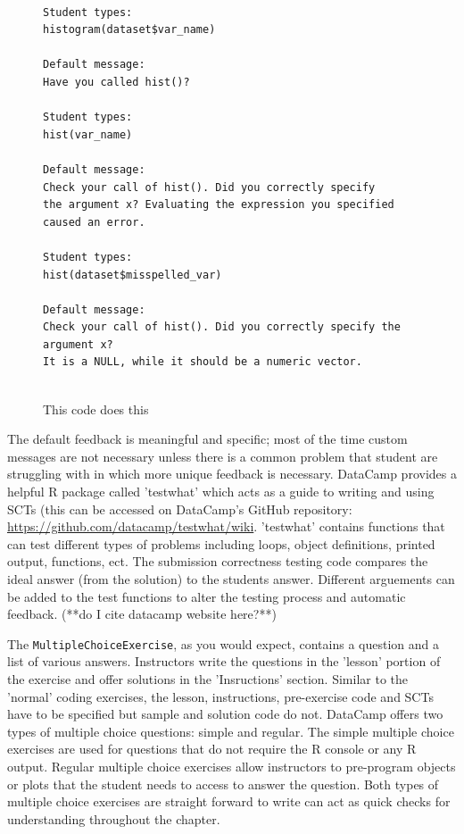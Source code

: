 \documentclass[12pt]{article}
\begin{document}
\begin{figure}
\caption{This code does this}
\begin{Verbatim}[frame=single]

Student types:
histogram(dataset$var_name)

Default message:
Have you called hist()?

Student types:
hist(var_name)

Default message:
Check your call of hist(). Did you correctly specify 
the argument x? Evaluating the expression you specified
caused an error.

Student types:
hist(dataset$misspelled_var)

Default message:
Check your call of hist(). Did you correctly specify the
argument x? 
It is a NULL, while it should be a numeric vector.


\end{Verbatim}
\label{fig:code1}
\end{figure}


















The default feedback is meaningful and specific; most of the time custom 
messages are not necessary unless there is a common problem that student are struggling with in which more unique feedback is necessary. 
DataCamp provides a helpful R package called 'testwhat' which acts as a guide to writing and using SCTs (this can be accessed on DataCamp's GitHub 
repository: \url{https://github.com/datacamp/testwhat/wiki}. 
'testwhat' contains functions that can test different types of problems including loops, object definitions, printed output, functions, ect.
The submission correctness testing code compares the ideal answer (from the solution) to the students answer. Different
arguements can be added to the test functions to alter the testing process and automatic feedback. (**do I cite datacamp website here?**)





The \texttt{MultipleChoiceExercise}, as you would expect, contains a question and a list of various answers. Instructors write the questions in the 'lesson'
portion of the exercise and offer solutions in the 'Insructions' section. Similar to the 'normal' coding exercises, the lesson, instructions, pre-exercise 
code and SCTs have to be specified but sample and solution code do not. DataCamp offers two types of multiple choice questions: simple and regular. 
The simple multiple choice exercises are used for questions that do not require the R console or any R output. Regular multiple choice exercises 
allow instructors to pre-program objects or plots that the student needs to access to answer the question. Both types of multiple choice exercises 
are straight forward to write can act as quick checks for understanding throughout the chapter.
\end{document}
